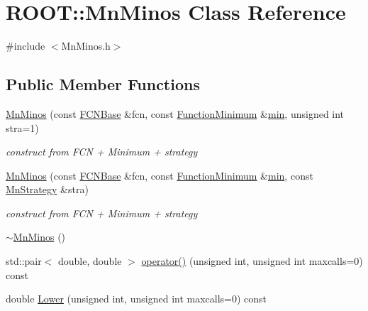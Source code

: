 \hypertarget{classROOT_1_1Minuit2_1_1MnMinos}{}\section{R\+O\+OT\+:\+:Mn\+Minos Class Reference}
\label{classROOT_1_1Minuit2_1_1MnMinos}


{\ttfamily \#include $<$Mn\+Minos.\+h$>$}

\subsection*{Public Member Functions}
\begin{DoxyCompactItemize}
\item 
\mbox{\hyperlink{classROOT_1_1Minuit2_1_1MnMinos_ac64ec75423efa6e473ee722f08f47eb4}{Mn\+Minos}} (const \mbox{\hyperlink{classROOT_1_1Minuit2_1_1FCNBase}{F\+C\+N\+Base}} \&fcn, const \mbox{\hyperlink{classROOT_1_1Minuit2_1_1FunctionMinimum}{Function\+Minimum}} \&\mbox{\hyperlink{SU3__internal_8h_ab0f5fed3171eb00d1c5f037d9f518a23}{min}}, unsigned int stra=1)
\begin{DoxyCompactList}\small\item\em construct from F\+CN + Minimum + strategy \end{DoxyCompactList}\item 
\mbox{\hyperlink{classROOT_1_1Minuit2_1_1MnMinos_a80f912ade0dd48d937bc04b14e28623c}{Mn\+Minos}} (const \mbox{\hyperlink{classROOT_1_1Minuit2_1_1FCNBase}{F\+C\+N\+Base}} \&fcn, const \mbox{\hyperlink{classROOT_1_1Minuit2_1_1FunctionMinimum}{Function\+Minimum}} \&\mbox{\hyperlink{SU3__internal_8h_ab0f5fed3171eb00d1c5f037d9f518a23}{min}}, const \mbox{\hyperlink{classROOT_1_1Minuit2_1_1MnStrategy}{Mn\+Strategy}} \&stra)
\begin{DoxyCompactList}\small\item\em construct from F\+CN + Minimum + strategy \end{DoxyCompactList}\item 
\mbox{\hyperlink{classROOT_1_1Minuit2_1_1MnMinos_a64625d0dd4308a7c8fb8930c980f11bd}{$\sim$\+Mn\+Minos}} ()
\item 
std\+::pair$<$ double, double $>$ \mbox{\hyperlink{classROOT_1_1Minuit2_1_1MnMinos_aa3605120b9628fe22416f723f25383b0}{operator()}} (unsigned int, unsigned int maxcalls=0) const
\item 
double \mbox{\hyperlink{classROOT_1_1Minuit2_1_1MnMinos_a0e6c6ab67bdd7b3461d900f64b4908ba}{Lower}} (unsigned int, unsigned int maxcalls=0) const

\end{DoxyCompactItemize}
